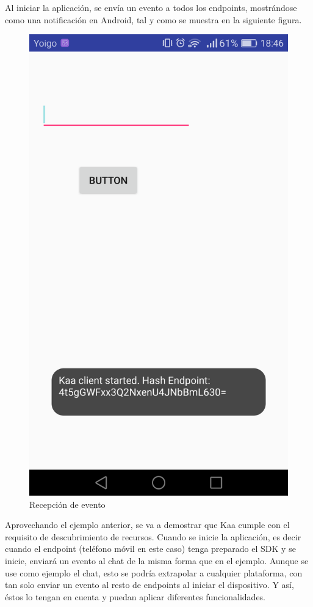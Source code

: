 \documentclass[12pt, twoside]{book}
\begin{document}
Al iniciar la aplicación, se envía un evento a todos los endpoints, mostrándose como una notificación en Android, tal y como se muestra en la siguiente figura.
\begin{figure}[H]
\centering
\includegraphics[scale=0.2]{images/screenshot1.png}
\caption{Recepción de evento}\label{L510}
\end{figure}


Aprovechando el ejemplo anterior, se va a demostrar que Kaa cumple con el requisito de descubrimiento de recursos. Cuando se inicie la aplicación, es decir cuando el endpoint (teléfono móvil en este caso) tenga preparado el SDK y se inicie, enviará un evento al chat de la misma forma que en el ejemplo. Aunque se use como ejemplo el chat, esto se podría extrapolar a cualquier plataforma, con tan solo enviar un evento al resto de endpoints al iniciar el dispositivo. Y así,  éstos lo tengan en cuenta y puedan aplicar diferentes funcionalidades.
\end{document}
